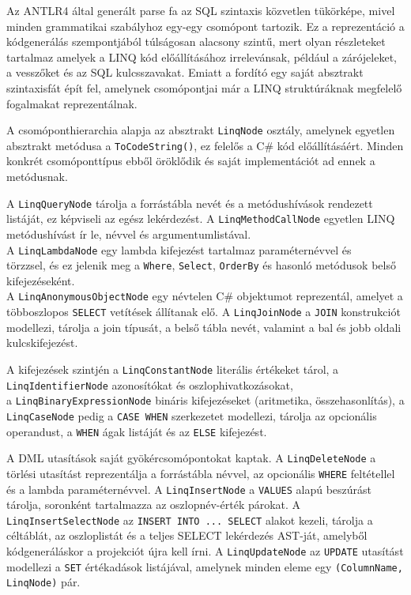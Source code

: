 \documentclass[a4paper,12pt]{article}
\begin{document}
Az ANTLR4 által generált parse fa az SQL szintaxis közvetlen tükörképe, mivel minden grammatikai szabályhoz egy-egy csomópont tartozik. Ez a reprezentáció a kódgenerálás szempontjából túlságosan alacsony szintű, mert olyan részleteket tartalmaz amelyek a LINQ kód előállításához irrelevánsak, például a zárójeleket, a vesszőket és az SQL kulcsszavakat. Emiatt a fordító egy saját absztrakt szintaxisfát épít fel, amelynek csomópontjai már a LINQ struktúráknak megfelelő fogalmakat reprezentálnak.

A csomóponthierarchia alapja az absztrakt \texttt{LinqNode} osztály, amelynek egyetlen absztrakt metódusa a \texttt{ToCodeString()}, ez felelős a C\# kód előállításáért. Minden konkrét csomóponttípus ebből öröklődik és saját implementációt ad ennek a metódusnak.

A \texttt{LinqQueryNode} tárolja a forrástábla nevét és a metódushívások rendezett listáját, ez képviseli az egész lekérdezést. A \texttt{LinqMethodCallNode} egyetlen LINQ metódushívást ír le, névvel és argumentumlistával. \\A \texttt{LinqLambdaNode} egy lambda kifejezést tartalmaz paraméternévvel és \\törzzsel, és ez jelenik meg a \texttt{Where}, \texttt{Select}, \texttt{OrderBy} és hasonló metódusok belső kifejezéseként. \\A \texttt{LinqAnonymousObjectNode} egy névtelen C\# objektumot reprezentál, amelyet a többoszlopos \texttt{SELECT} vetítések állítanak elő. A \texttt{LinqJoinNode} a \texttt{JOIN} konstrukciót modellezi, tárolja a join típusát, a belső tábla nevét, valamint a bal és jobb oldali kulcskifejezést.

A kifejezések szintjén a \texttt{LinqConstantNode} literális értékeket tárol, a \texttt{LinqIdentifierNode} azonosítókat és oszlophivatkozásokat, \\a \texttt{LinqBinaryExpressionNode} bináris kifejezéseket (aritmetika, összehasonlítás), a \texttt{LinqCaseNode} pedig a \texttt{CASE WHEN} szerkezetet modellezi, tárolja az opcionális operandust, a \texttt{WHEN} ágak listáját és az \texttt{ELSE} kifejezést.

A DML utasítások saját gyökércsomópontokat kaptak. A \texttt{LinqDeleteNode} a törlési utasítást reprezentálja a forrástábla névvel, az opcionális \texttt{WHERE} feltétellel és a lambda paraméternévvel. A \texttt{LinqInsertNode} a \texttt{VALUES} alapú beszúrást tárolja, soronként tartalmazza az oszlopnév-érték párokat. A \texttt{LinqInsertSelectNode} az \texttt{INSERT INTO ... SELECT} alakot kezeli, tárolja a céltáblát, az oszloplistát és a teljes SELECT lekérdezés AST-ját, amelyből kódgeneráláskor a projekciót újra kell írni. A \texttt{LinqUpdateNode} az \texttt{UPDATE} utasítást modellezi a \texttt{SET} értékadások listájával, amelynek minden eleme egy \texttt{(ColumnName, LinqNode)} pár.
\end{document}
